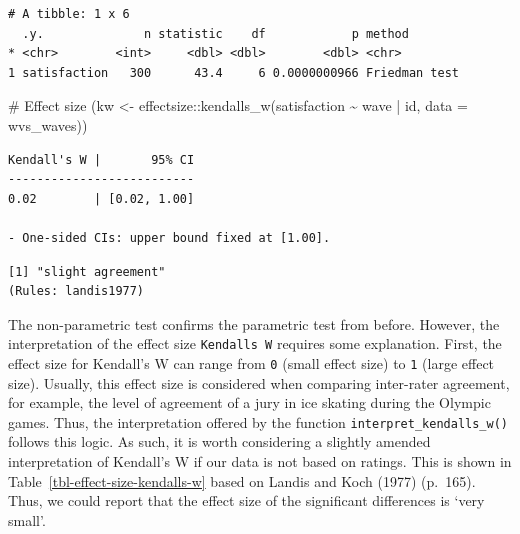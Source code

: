 \documentclass[
  letterpaper,
]{krantz}
\makeatletter
\newenvironment{Shaded}{\begin{snugshade}}{\end{snugshade}}
\newcommand{\AttributeTok}[1]{\textcolor[rgb]{0.40,0.45,0.13}{#1}}
\newcommand{\CommentTok}[1]{\textcolor[rgb]{0.37,0.37,0.37}{#1}}
\newcommand{\FunctionTok}[1]{\textcolor[rgb]{0.28,0.35,0.67}{#1}}
\newcommand{\NormalTok}[1]{\textcolor[rgb]{0.00,0.23,0.31}{#1}}
\newcommand{\OtherTok}[1]{\textcolor[rgb]{0.00,0.23,0.31}{#1}}
\newcommand{\SpecialCharTok}[1]{\textcolor[rgb]{0.37,0.37,0.37}{#1}}
\newenvironment{kframe}{%
\medskip{}
\setlength{\fboxsep}{.8em}
 \def\at@end@of@kframe{}%
 \ifinner\ifhmode%
  \def\at@end@of@kframe{\end{minipage}}%
  \begin{minipage}{\columnwidth}%
 \fi\fi%
 \def\FrameCommand##1{\hskip\@totalleftmargin \hskip-\fboxsep
 \colorbox{shadecolor}{##1}\hskip-\fboxsep
     \hskip-\linewidth \hskip-\@totalleftmargin \hskip\columnwidth}%
 \MakeFramed {\advance\hsize-\width
   \@totalleftmargin\z@ \linewidth\hsize
   \@setminipage}}%
 {\par\unskip\endMakeFramed%
 \at@end@of@kframe}
\renewenvironment{Shaded}{\begin{kframe}}{\end{kframe}}
\makeatother
\begin{document}
\begin{verbatim}
# A tibble: 1 x 6
  .y.              n statistic    df            p method       
* <chr>        <int>     <dbl> <dbl>        <dbl> <chr>        
1 satisfaction   300      43.4     6 0.0000000966 Friedman test
\end{verbatim}

\begin{Shaded}
\begin{Highlighting}[]
\CommentTok{\# Effect size}
\NormalTok{(kw }\OtherTok{\textless{}{-}}\NormalTok{ effectsize}\SpecialCharTok{::}\FunctionTok{kendalls\_w}\NormalTok{(satisfaction }\SpecialCharTok{\textasciitilde{}}\NormalTok{ wave }\SpecialCharTok{|}\NormalTok{ id,}
                       \AttributeTok{data =}\NormalTok{ wvs\_waves))}
\end{Highlighting}
\end{Shaded}

\begin{verbatim}
Kendall's W |       95% CI
--------------------------
0.02        | [0.02, 1.00]

- One-sided CIs: upper bound fixed at [1.00].
\end{verbatim}

\begin{Shaded}
\end{Shaded}

\begin{verbatim}
[1] "slight agreement"
(Rules: landis1977)
\end{verbatim}

The non-parametric test confirms the parametric test from before.
However, the interpretation of the effect size
\texttt{Kendall\textquotesingle{}s\ W} requires some explanation. First,
the effect size for Kendall's W can range from \texttt{0} (small effect
size) to \texttt{1} (large effect size). Usually, this effect size is
considered when comparing inter-rater agreement, for example, the level
of agreement of a jury in ice skating during the Olympic games. Thus,
the interpretation offered by the function
\texttt{interpret\_kendalls\_w()} follows this logic. As such, it is
worth considering a slightly amended interpretation of Kendall's W if
our data is not based on ratings. This is shown in
Table~\ref{tbl-effect-size-kendalls-w} based on Landis and Koch (1977)
(p.~165). Thus, we could report that the effect size of the significant
differences is `very small'.
\end{document}
